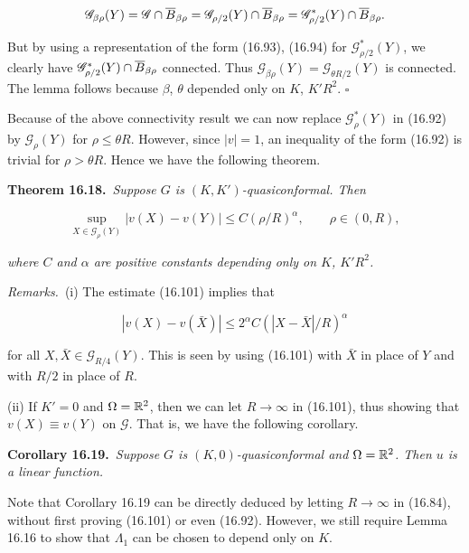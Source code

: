 \[
\mathscr{G}_{\beta\rho}(Y)=\mathscr{G}\cap\overline{B}_{\beta\rho}
=\mathscr{G}_{\rho/2}(Y)\cap\overline{B}_{\beta\rho}
=\mathscr{G}^*_{\rho/2}(Y)\cap\overline{B}_{\beta\rho}.
\]

But by using a representation of the form (16.93), (16.94) for $\mathscr{G}^*_{\rho/2}(Y)$, we clearly
have $\mathscr{G}^*_{\rho/2}(Y)\cap\overline{B}_{\beta\rho}$ connected. Thus $\mathscr{G}_{\beta\rho}(Y)=\mathscr{G}_{\theta R/2}(Y)$ is connected. The lemma
follows because $\beta$, $\theta$ depended only on $K$, $K'R^2$.
$\square$

Because of the above connectivity result we can now replace $\mathscr{G}^*_{\rho}(Y)$ in (16.92)
by $\mathscr{G}_{\rho}(Y)$ for $\rho\le \theta R$. However, since $|v|=1$, an inequality of the form (16.92)
is trivial for $\rho>\theta R$. Hence we have the following theorem.

\noindent\textbf{Theorem 16.18.}\ \emph{Suppose $G$ is $(K,K')$-quasiconformal. Then}

\begin{equation}
\tag{16.101}
\sup_{X\in\mathscr{G}_{\rho}(Y)}|v(X)-v(Y)|\le C(\rho/R)^\alpha,\qquad \rho\in(0,R),
\end{equation}

\emph{where $C$ and $\alpha$ are positive constants depending only on $K$, $K'R^2$.}

\smallskip

\noindent\emph{Remarks.}\ (i) The estimate (16.101) implies that

\begin{equation}
\tag{16.102}
|v(X)-v(\bar X)|\le 2^\alpha C(|X-\bar X|/R)^\alpha
\end{equation}

for all $X,\bar X\in\mathscr{G}_{R/4}(Y)$. This is seen by using (16.101) with $\bar X$ in place of $Y$ and with
$R/2$ in place of $R$.

(ii) If $K'=0$ and $\Omega=\mathbb{R}^2$, then we can let $R\to\infty$ in (16.101), thus showing
that $v(X)\equiv v(Y)$ on $\mathscr{G}$. That is, we have the following corollary.

\noindent\textbf{Corollary 16.19.}\ \emph{Suppose $G$ is $(K,0)$-quasiconformal and $\Omega=\mathbb{R}^2$. Then $u$ is a
linear function.}

Note that Corollary 16.19 can be directly deduced by letting $R\to\infty$ in (16.84),
without first proving (16.101) or even (16.92). However, we still require Lemma
16.16 to show that $\Lambda_1$ can be chosen to depend only on $K$.

